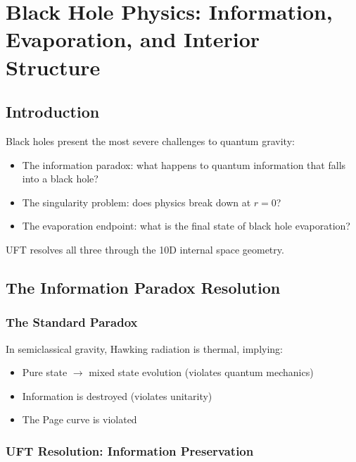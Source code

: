 \section{Black Hole Physics: Information, Evaporation, and Interior Structure}
\label{sec:bh_physics_complete}

\subsection{Introduction}

Black holes present the most severe challenges to quantum gravity:
\begin{itemize}
    \item The information paradox: what happens to quantum information that falls into a black hole?
    \item The singularity problem: does physics break down at $r = 0$?
    \item The evaporation endpoint: what is the final state of black hole evaporation?
\end{itemize}

UFT resolves all three through the 10D internal space geometry.

\subsection{The Information Paradox Resolution}

\subsubsection{The Standard Paradox}

In semiclassical gravity, Hawking radiation is thermal, implying:
\begin{itemize}
    \item Pure state $\to$ mixed state evolution (violates quantum mechanics)
    \item Information is destroyed (violates unitarity)
    \item The Page curve is violated
\end{itemize}

\subsubsection{UFT Resolution: Information Preservation}

